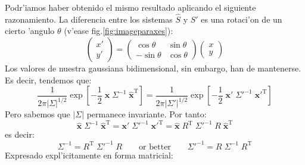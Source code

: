 Podr'iamos haber obtenido el mismo resultado aplicando el siguiente
razonamiento. La diferencia entre los sistemas $\hat{S}$ y $S'$ es una
rotaci'on de un cierto 'angulo $\theta$ (v'ease
fig.\ref{fig:imageparaxes}):
%
\begin{equation}
  \label{eq:rot}
  \begin{pmatrix}
    x' \\ y'
  \end{pmatrix} =
  \begin{pmatrix}
    \cos\theta & \sin\theta \\ -\sin\theta & \cos\theta
  \end{pmatrix}
  \begin{pmatrix}
    x \\ y
  \end{pmatrix}
\end{equation}
%
Los valores de nuestra gaussiana bidimensional, sin embargo, han de
mantenerse. Es decir, tendemos que:
%
\begin{equation}
  \label{eq:equalz}
  \frac{1}{2\pi|\Sigma|^{1/2}} 
  \exp\left[ -\frac{1}{2} \;
    \hat{\mathbf{x}} \; \Sigma^{-1} \; \hat{\mathbf{x}}^{\mathrm{T}}
  \right]
  =
  \frac{1}{2\pi|\Sigma'|^{1/2}} 
  \exp\left[ -\frac{1}{2} \;
    {\mathbf{x}'} \; {\Sigma'}^{-1} \; {\mathbf{x}'}^{\mathrm{T}}
  \right]  
\end{equation}
%
Pero sabemos que $|\Sigma|$ permanece invariante. Por tanto:
%
\begin{equation}
  \label{eq:equalzvec}
  \hat{\mathbf{x}} \; \Sigma^{-1} \; \hat{\mathbf{x}}^{\mathrm{T}} =
  {\mathbf{x}'} \; {\Sigma'}^{-1} \; {\mathbf{x}'}^{\mathrm{T}} =
  \hat{\mathbf{x}} \; R^{\mathrm{T}} \; 
  {\Sigma'}^{-1} \; R \; \hat{\mathbf{x}}^{\mathrm{T}}
\end{equation}
%
es decir:
%
\begin{equation}
  \label{eq:equalmat}
  \Sigma^{-1} = R^{\mathrm{T}} \; {\Sigma'}^{-1} \; R 
  \qquad \text{or better} \qquad
  {\Sigma'}^{-1} = R \; \Sigma^{-1} \; R^{\mathrm{T}} 
\end{equation}
%
Expresado expl'icitamente en forma matricial:
%
